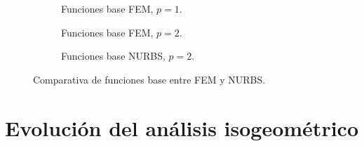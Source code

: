 \documentclass[11pt]{book}
\theoremstyle{plain} %
\theoremstyle{definition} %
\theoremstyle{definition} %
\begin{document}
\begin{figure}[H]
    \centering
    \begin{subfigure}{0.32\textwidth}
        {
            \small
        
        
        }

        \vspace{-0.5cm}

        \caption{Funciones base FEM, $p=1$.}
        \label{fig:FEM_IGA_1}
    \end{subfigure}
    \hfill
    \begin{subfigure}{0.33\textwidth}
        {
        \small
        
        }

        \vspace{-0.5cm}

        \caption{Funciones base FEM, $p=2$.}
        \label{fig:FEM_IGA_2}
    \end{subfigure}
    \hfill
    \begin{subfigure}{0.32\textwidth}
        {
        \small
        
        }

        \vspace{-0.5cm}

        \caption{Funciones base NURBS, $p=2$.}
        \label{fig:FEM_IGA_3}

    \end{subfigure}
    \vspace{-0.5em} %

    \vspace{-0.1cm}

    \caption{Comparativa de funciones base entre FEM y NURBS.}
    \label{fig:comparativa_bases_completa}
\end{figure}

\vspace{-1cm}

\section{Evolución del análisis isogeométrico}
\end{document}
